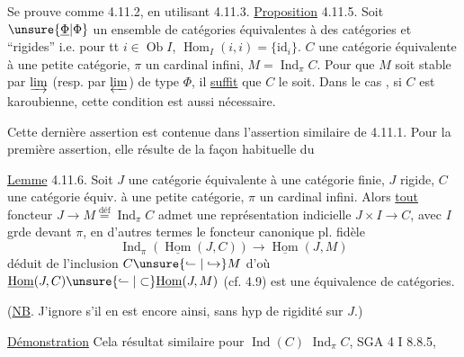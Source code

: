 Se prouve comme 4.11.2, en utilisant 4.11.3.
\uline{Proposition} 4.11.5. Soit $\unsure{\underline{\Phi}|\Phi}$ un ensemble de  catégories  équivalentes à des  catégories  et ``rigides'' i.e. pour tt $i\in\operatorname{Ob} I$,  $\operatorname{Hom}_I(i,i)=\{\mathrm{id}_i\}$.
  $C$ une catégorie équivalente à une petite catégorie, $\pi$ un cardinal infini, $M=\operatorname{Ind}_\pi C$. Pour que $M$ soit stable par $\varinjlim$ (resp. par $\varprojlim$) de type $\Phi$, il \uline{suffit} que $C$ le soit. Dans le cas , si $C$ est karoubienne, cette condition est aussi nécessaire.

Cette dernière assertion est contenue dans l'assertion similaire de 4.11.1. Pour la première assertion, elle résulte de la façon habituelle du

\uline{Lemme} 4.11.6. Soit $J$ une catégorie équivalente à une  catégorie finie, $J$ rigide,  $C$ une catégorie équiv. à une petite catégorie, $\pi$ un cardinal infini.
Alors \uline{tout} foncteur  $J\longrightarrow M\overset{\mathrm{déf}}{=}\operatorname{Ind}_\pi C$ admet une représentation indicielle $J\times I\longrightarrow C$, avec $I$ grde devant $\pi$, en d'autres termes le
foncteur canonique pl. fidèle
\[
\operatorname{Ind}_\pi(\underline{\operatorname{Hom}}(J,C))\longrightarrow\underline{\operatorname{Hom}}(J,M)
\]
déduit de l'inclusion $C\unsure{\mathrel{\lhook\joinrel\relbar}|\hookrightarrow} M$  d'où $\underline{\operatorname{Hom}}(J,C)\unsure{\mathrel{\lhook\joinrel\relbar}|\subset}\underline{\operatorname{Hom}}(J,M)$ (cf. 4.9) est une équivalence de catégories.

(\uline{NB}. J'ignore s'il en est encore ainsi, sans hyp de rigidité sur $J$.)

\uline{Démonstration} Cela   résultat  similaire pour $\operatorname{Ind}(C)$  $\operatorname{Ind}_\pi C$,   SGA 4 I 8.8.5, 

